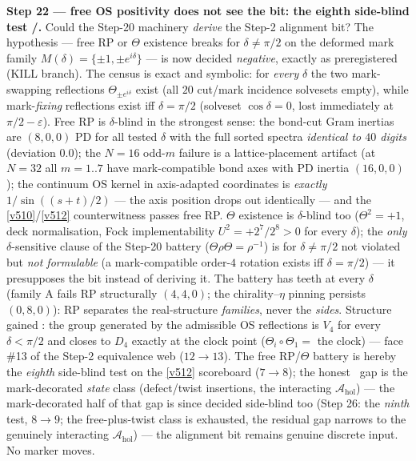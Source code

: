 \documentclass[11pt,a4paper]{article}
\theoremstyle{definition}
\begin{document}
\par\smallskip\noindent\textbf{Step 22 --- free OS positivity does not see the bit: the eighth
side-blind test \mE/\mC.} Could the Step-20 machinery \emph{derive} the Step-2 alignment bit?
The hypothesis --- free RP or $\Theta$ existence breaks for $\delta\neq\pi/2$ on the deformed
mark family $M(\delta)=\{\pm1,\pm e^{i\delta}\}$ --- is now decided \emph{negative}, exactly as
preregistered (KILL branch). The census is exact and symbolic: for \emph{every} $\delta$ the two
mark-swapping reflections $\Theta_{\pm e^{i\delta}}$ exist (all $20$ cut/mark incidence
solvesets empty), while mark-\emph{fixing} reflections exist iff $\delta=\pi/2$ (solveset
$\cos\delta=0$, lost immediately at $\pi/2-\varepsilon$). Free RP is $\delta$-blind in the
strongest sense: the bond-cut Gram inertias are $(8,0,0)$ PD for all tested $\delta$ with the
full sorted spectra \emph{identical to $40$ digits} (deviation $0.0$); the $N=16$ odd-$m$
failure is a lattice-placement artifact (at $N=32$ all $m=1..7$ have mark-compatible bond axes
with PD inertia $(16,0,0)$); the continuum OS kernel in axis-adapted coordinates is
\emph{exactly} $1/\sin((s{+}t)/2)$ --- the axis position drops out identically --- and the
\vref{v510}/\vref{v512} counterwitness passes free RP. $\Theta$ existence is $\delta$-blind too
($\Theta^2=+1$, deck normalisation, Fock implementability $U^2=+2^7/2^8>0$ for every $\delta$);
the \emph{only} $\delta$-sensitive clause of the Step-20 battery ($\Theta\rho\Theta=\rho^{-1}$)
is for $\delta\neq\pi/2$ not violated but \emph{not formulable} (a mark-compatible order-$4$
rotation exists iff $\delta=\pi/2$) --- it presupposes the bit instead of deriving it. The
battery has teeth at every $\delta$ (family A fails RP structurally $(4,4,0)$; the
chirality--$\eta$ pinning persists $(0,8,0)$): RP separates the real-structure \emph{families},
never the \emph{sides}. Structure gained \mC: the group generated by the admissible OS
reflections is $V_4$ for every $\delta<\pi/2$ and closes to $D_4$ exactly at the clock point
($\Theta_i\circ\Theta_1=$ the clock) --- face \#13 of the Step-2 equivalence web ($12\to13$).
The free RP/$\Theta$ battery is hereby the \emph{eighth} side-blind test on the \vref{v512}
scoreboard ($7\to8$); the honest \mO\ gap is the mark-decorated \emph{state} class
(defect/twist insertions, the interacting $\mathcal A_{\mathrm{hol}}$) --- the mark-decorated
half of that gap is since decided side-blind too (Step 26: the \emph{ninth} test, $8\to9$;
the free-plus-twist class is exhausted, the residual gap narrows to the genuinely interacting
$\mathcal A_{\mathrm{hol}}$) --- the alignment bit
remains genuine discrete input. No marker moves.
\end{document}
